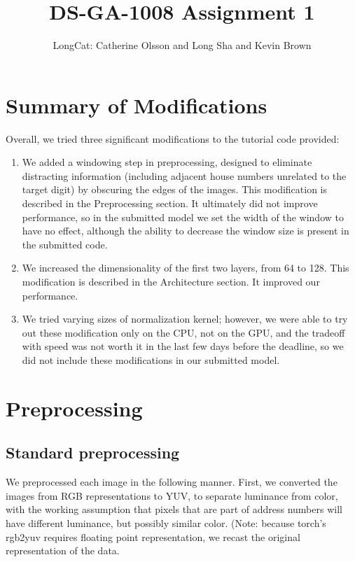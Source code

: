 \documentclass{article}
\title{DS-GA-1008 Assignment 1}
\author{LongCat: Catherine Olsson and Long Sha and Kevin Brown}
\begin{document}
 \maketitle


\section{Summary of Modifications}

Overall, we tried three significant modifications to the tutorial code
provided:

\begin{enumerate}
\item We added a windowing step in preprocessing, designed to eliminate distracting information (including adjacent house numbers unrelated to the target digit) by obscuring the edges of the images. This modification is described in the Preprocessing section. It ultimately did not improve performance, so in the submitted model we set the width of the window to have no effect, although the ability to decrease the window size is present in the submitted code.

\item We increased the dimensionality of the first two layers, from 64 to 128. This modification is described in the Architecture section. It improved our performance.

\item We tried varying sizes of normalization kernel; however, we were able to try out these modification only on the CPU, not on the GPU, and the tradeoff with speed was not worth it in the last few days before the deadline, so we did not include these modifications in our submitted model.
\end{enumerate}

\section{Preprocessing}

\subsection{Standard preprocessing}
We preprocessed each image in the following manner. First, we converted the
images from RGB representations to YUV, to separate luminance from color, with
the working assumption that pixels that are part of address numbers will have
different luminance, but possibly similar color. (Note: because torch's rgb2yuv
requires floating point representation, we recast the original representation of the data.
\end{document}
